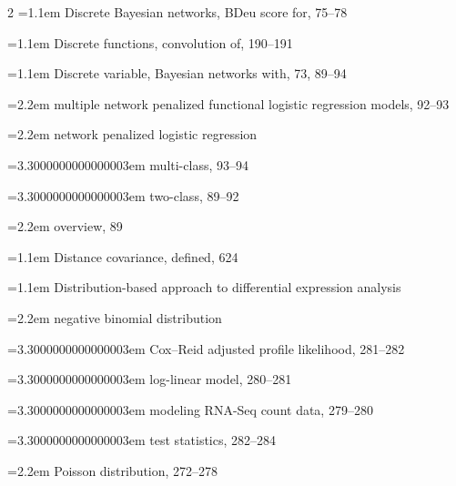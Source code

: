 \begin{multicols}{2}
\noindent\hangindent=1.1em Discrete Bayesian networks, BDeu score for, 75--78\par
\noindent\hangindent=1.1em Discrete functions, convolution of, 190--191\par
\noindent\hangindent=1.1em Discrete variable, Bayesian networks with, 73, 89--94\par
\noindent\hangindent=2.2em \hspace*{1.1em}multiple network penalized functional logistic regression models, 92--93\par
\noindent\hangindent=2.2em \hspace*{1.1em}network penalized logistic regression\par
\noindent\hangindent=3.3000000000000003em \hspace*{2.2em}multi-class, 93--94\par
\noindent\hangindent=3.3000000000000003em \hspace*{2.2em}two-class, 89--92\par
\noindent\hangindent=2.2em \hspace*{1.1em}overview, 89\par
\noindent\hangindent=1.1em Distance covariance, defined, 624\par
\noindent\hangindent=1.1em Distribution-based approach to differential expression analysis\par
\noindent\hangindent=2.2em \hspace*{1.1em}negative binomial distribution\par
\noindent\hangindent=3.3000000000000003em \hspace*{2.2em}Cox--Reid adjusted profile likelihood, 281--282\par
\noindent\hangindent=3.3000000000000003em \hspace*{2.2em}log-linear model, 280--281\par
\noindent\hangindent=3.3000000000000003em \hspace*{2.2em}modeling RNA-Seq count data, 279--280\par
\noindent\hangindent=3.3000000000000003em \hspace*{2.2em}test statistics, 282--284\par
\noindent\hangindent=2.2em \hspace*{1.1em}Poisson distribution, 272--278\par

\end{multicols}
